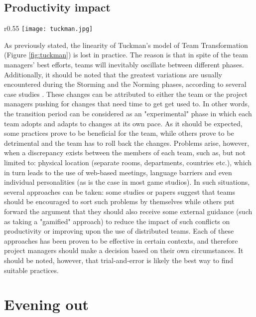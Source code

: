 \documentclass{scrartcl}
\begin{document}
    \subsection{Productivity impact}
    
    \begin{wrapfigure}{r}{0.55\textwidth}
        \centering
        \texttt{[image: tuckman.jpg]}
        \caption{practice vs. theory}
        \label{fig:tuckman}
    \end{wrapfigure}
    
    As previously stated, the linearity of Tuckman's model of Team Transformation (Figure \ref{fig:tuckman}) is lost in practice. The reason is that in spite of the team managers' best efforts, teams will inevitably oscillate between different phases. Additionally, it should be noted that the greatest variations are usually encountered during the Storming and the Norming phases, according to several case studies \cite{4599456, 4599458}. These changes can be attributed to either the team or the project managers pushing for changes that need time to get get used to. In other words, the transition period can be considered as an "experimental" phase in which each team adopts and adapts to changes at its own pace. As it should be expected, some practices prove to be beneficial for the team, while others prove to be detrimental and the team has to roll back the changes. Problems arise, however, when a discrepancy exists between the members of each team, such as, but not limited to: physical location (separate rooms, departments, countries etc.), which in turn leads to the use of web-based meetings, language barriers and even individual personalities (as is the case in most game studios). In such situations, several approaches can be taken: some studies or papers suggest that teams should be encouraged to sort such problems by themselves \cite{4599458, 4599456, 4293601} while others put forward the argument that they should also receive some external guidance (such as taking a "gamified" approach) to reduce the impact of such conflicts on productivity \cite{7883385, 6475422} or improving upon the use of distributed teams. Each of these approaches has been proven to be effective in certain contexts, and therefore project managers should make a decision based on their own circumstances. It should be noted, however, that trial-and-error is likely the best way to find suitable practices.
    
    \section{Evening out}
    
\end{document}
